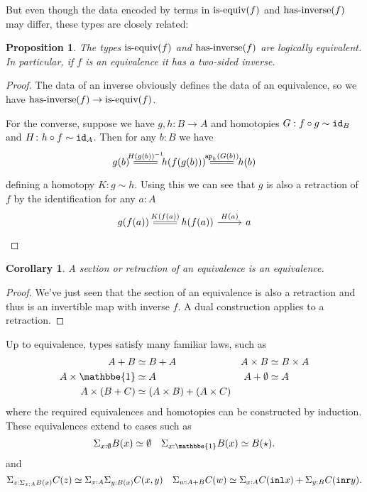 \documentclass{amsart}
\theoremstyle{theorem}
\newtheorem*{cor}{Corollary}
\newtheorem*{prop}{Proposition}
\theoremstyle{definition}
\theoremstyle{remark}
\newcommand{\0}{\mathbbe{0}}
\newcommand{\1}{\mathbbe{1}}
\newcommand{\2}{\mathbbe{2}}
\newcommand{\3}{\mathbbe{3}}
\newcommand{\4}{\mathbbe{4}}
\newcommand{\term}[1]{{\textup{\texttt{#1}}}}
\newcommand{\type}[1]{{\textup{#1}}}
\newcommand{\id}{\term{id}}
\newcommand{\inl}{\term{inl}}
\newcommand{\inr}{\term{inr}}
\newcommand{\ap}{\term{ap}}
\begin{document}
But even though the data encoded by terms in $\type{is-equiv}(f)$ and $\type{has-inverse}(f)$ may differ, these types are closely related:

\begin{prop} The types $\type{is-equiv}(f)$ and $\type{has-inverse}(f)$ are logically equivalent. In particular, if $f$ is an equivalence it has a two-sided inverse.
\end{prop}
\begin{proof}
The data of an inverse obviously defines the data of an equivalence, so we have $\type{has-inverse}(f) \to \type{is-equiv}(f)$.

For the converse, suppose we have $g,h \colon B \to A$ and homotopies $G : f \circ g \sim \id_B$ and $H \colon h \circ f \sim \id_A$.  Then for any $b : B$ we have
\[
\begin{tikzcd} g(b) \arrow[r, equals, "H(g(b))^{-1}"] & h(f(g(b))) \arrow[r, equals, "\ap_h(G(b))"] & h(b)
\end{tikzcd}
\]
defining a homotopy $K \colon g \sim h$. Using this we can see that $g$ is also a retraction of $f$ by the identification for any $a :A$
\[
\begin{tikzcd} g(f(a)) \arrow[r, "K(f(a))", equals] & h(f(a)) \arrow[r, "H(a)"] & a
\end{tikzcd}
\]
\end{proof}

\begin{cor} A section or retraction of an equivalence is an equivalence. 
\end{cor}
\begin{proof}
We've just seen that the section of an equivalence is also a retraction and thus is an invertible map with inverse $f$. A dual construction applies to a retraction.
\end{proof}

Up to equivalence, types satisfy many familiar laws, such as
\begin{align*}
A+B &\simeq B + A & A \times B &\simeq B \times A\\
A \times \1 &\simeq A & A+\emptyset &\simeq A \\
A \times (B + C) &\simeq (A \times B) + (A \times C)
 \end{align*}
where the required equivalences and homotopies can be constructed by induction. These equivalences extend to cases such as
\[ \Sigma_{x : \emptyset} B(x) \simeq \emptyset \quad \Sigma_{x : \1}B(x)\simeq B(\star).\]
and
\[ \Sigma_{z : \Sigma_{x : A}B(x)} C(z) \simeq \Sigma_{x :A} \Sigma_{y : B(x)} C(x,y) \quad \Sigma_{w : A +B}C(w) \simeq \Sigma_{x :A} C(\inl x) + \Sigma_{y : B} C(\inr y).\]
\end{document}
